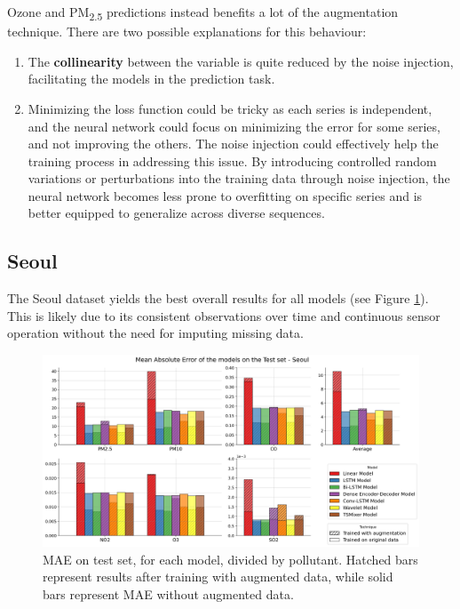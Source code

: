 Ozone and PM\textsubscript{2.5} predictions instead benefits a lot of the augmentation technique. There are two possible explanations for this behaviour:
\begin{enumerate}
    \item The \textbf{collinearity} between the variable is quite reduced by the noise injection, facilitating the models in the prediction task.
    \item Minimizing the loss function could be tricky as each series is independent, and the neural network could focus on minimizing the error for some series, and not improving the others. The noise injection could effectively help the training process in addressing this issue. By introducing controlled random variations or perturbations into the training data through noise injection, the neural network becomes less prone to overfitting on specific series and is better equipped to generalize across diverse sequences.
\end{enumerate}

\subsection{Seoul}

The Seoul dataset yields the best overall results for all models (see Figure \ref{fig:seoul_results}). This is likely due to its consistent observations over time and continuous sensor operation without the need for imputing missing data.

\begin{figure}[h]
    \centering
    \includegraphics[width=1\linewidth]{images/Seoul_results.png}
    \caption{MAE on test set, for each model, divided by pollutant. Hatched bars represent results after training with augmented data, while solid bars represent MAE without augmented data.}
    \label{fig:seoul_results}
\end{figure}

